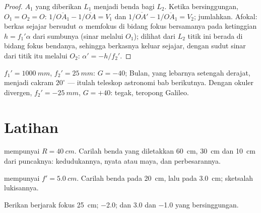 \begin{proof}
 $A_1$ yang diberikan $L_1$ menjadi benda bagi $L_2$. Ketika
bersinggungan, $O_1 = O_2 = O$: $1/\overline{OA_1} - 1/\overline{OA} = V_1$ dan
$1/\overline{OA'} - 1/\overline{OA_1} = V_2$; jumlahkan. Afokal: berkas
sejajar bersudut $\alpha$ memfokus di bidang fokus bersamanya pada
ketinggian $h = f_1'\alpha$ dari sumbunya (sinar melalui $O_1$); dilihat
dari $L_2$ titik ini berada di bidang fokus bendanya, sehingga berkasnya
keluar sejajar, dengan sudut sinar dari titik itu melalui $O_2$:
$\alpha' = -h/f_2'$.
\end{proof}

\begin{example}\label{ex:b1:mirrors-thin-lenses:afocal}
$f_1' = \qty{1000}{mm}$, $f_2' = \qty{25}{mm}$: $G = -40$; Bulan, yang
lebarnya setengah derajat, menjadi cakram $20^\circ$ --- itulah teleskop
astronomi bab berikutnya. Dengan okuler divergen, $f_2' = \qty{-25}{mm}$,
$G = +40$: tegak, teropong Galileo.
\end{example}

\section{Latihan}

\begin{exercise}[$\star$]\label{exo:b1:mirrors-thin-lenses:1}
 mempunyai $R = \qty{40}{cm}$. Carilah  benda yang
diletakkan \qty{60}{cm}, \qty{30}{cm} dan \qty{10}{cm} dari puncaknya:
kedudukannya, nyata atau maya, dan perbesarannya.
\end{exercise}

\begin{exercise}[$\star$]\label{exo:b1:mirrors-thin-lenses:2}
 mempunyai $f' = \qty{5.0}{cm}$. Carilah  benda
pada \qty{20}{cm}, lalu pada \qty{3.0}{cm}; sketsalah lukisannya.
\end{exercise}

\begin{exercise}[$\star$]\label{exo:b1:mirrors-thin-lenses:3}
Berikan   berjarak fokus \qty{25}{cm};  
\qty{-2.0}{\delta}; dan   \qty{+3.0}{\delta} dan
\qty{-1.0}{\delta} yang bersinggungan.
\end{exercise}

